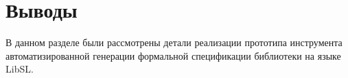 \section{Выводы}

В данном разделе были рассмотрены детали реализации прототипа инструмента автоматизированной генерации формальной спецификации библиотеки на языке LibSL.